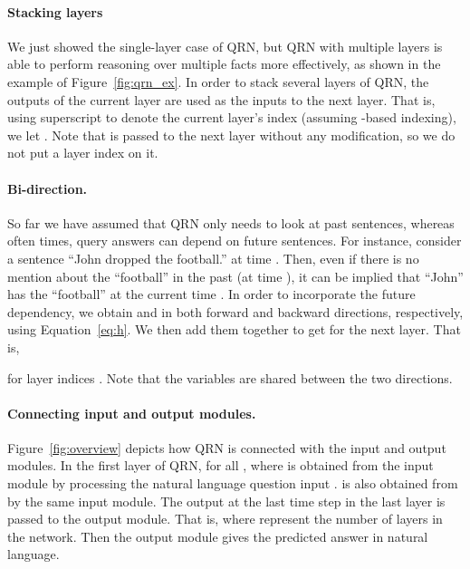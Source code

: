 \documentclass[table]{article}
\begin{document}
\paragraph{Stacking layers} We just showed the single-layer case of QRN, but QRN with multiple layers is able to perform reasoning over multiple facts more effectively, as shown in the example of Figure~\ref{fig:qrn_ex}.
In order to stack several layers of QRN, the outputs of the current layer are used as the inputs to the next layer. 
That is, using superscript  to denote the current layer's index (assuming -based indexing), we let 
.
Note that  is passed to the next layer without any modification, so we do not put a layer index on it.

\paragraph{Bi-direction.}
So far we have assumed that QRN only needs to look at past sentences, whereas
often times, query answers can depend on future sentences.
For instance, consider a sentence ``John dropped the football.'' at time .
Then, even if there is no mention about the ``football'' in the past (at time ), 
it can be implied that ``John'' has the ``football'' at the current time . 
In order to incorporate the future dependency, we obtain  and  in both forward and backward directions, respectively, using Equation~\ref{eq:h}. We then  add them together to get  for the next layer. That is,

for layer indices .
Note that  the variables  are shared between the two directions.

\paragraph{Connecting input and output modules.}
Figure~\ref{fig:overview} depicts how QRN is connected with the input and output modules. 
In the first layer of QRN,  for all , where  is obtained from the input module by processing the natural language question input .
 is also obtained from  by the same input module.
The output at the last time step in the last layer is passed to the output module.
That is,  where  represent the number of layers in the network.
Then the output module gives the predicted answer  in natural language.
\end{document}
